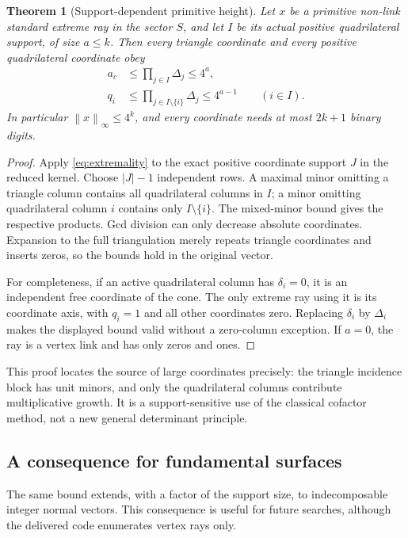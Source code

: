 \documentclass[11pt]{article}
\newtheorem{theorem}{Theorem}[section]
\theoremstyle{definition}
\theoremstyle{remark}
\newcommand{\norm}[1]{\left\lVert#1\right\rVert}
\begin{document}
\begin{theorem}[Support-dependent primitive height]
\label{thm:height}
Let $x$ be a primitive non-link standard extreme ray in the sector $S$, and
let $I$ be its actual positive quadrilateral support, of size $a\le k$.
Then every triangle coordinate and every positive quadrilateral coordinate
obey
\begin{align}
 a_c&\le\prod_{j\in I}\Delta_j\le4^a,\label{eq:triangleheight}\\
 q_i&\le\prod_{j\in I\setminus\{i\}}\Delta_j\le4^{a-1}
 \qquad(i\in I).\label{eq:quadheight}
\end{align}
In particular $\norm{x}_\infty\le4^k$, and every coordinate needs at most
$2k+1$ binary digits.
\end{theorem}
\begin{proof}
Apply \eqref{eq:extremality} to the exact positive coordinate support $J$ in
the reduced kernel. Choose $|J|-1$ independent rows. A maximal minor omitting
a triangle column contains all quadrilateral columns in $I$; a minor omitting
quadrilateral column $i$ contains only $I\setminus\{i\}$. The mixed-minor
bound gives the respective products. Gcd division can only decrease absolute
coordinates. Expansion to the full triangulation merely repeats triangle
coordinates and inserts zeros, so the bounds hold in the original vector.

For completeness, if an active quadrilateral column has $\delta_i=0$, it is
an independent free coordinate of the cone. The only extreme ray using it is
its coordinate axis, with $q_i=1$ and all other coordinates zero. Replacing
$\delta_i$ by $\Delta_i$ makes the displayed bound valid without a zero-column
exception. If $a=0$, the ray is a vertex link and has only zeros and ones.
\end{proof}

This proof locates the source of large coordinates precisely: the triangle
incidence block has unit minors, and only the quadrilateral columns contribute
multiplicative growth. It is a support-sensitive use of the classical
cofactor method, not a new general determinant principle.

\subsection{A consequence for fundamental surfaces}

The same bound extends, with a factor of the support size, to indecomposable
integer normal vectors. This consequence is useful for future searches,
although the delivered code enumerates vertex rays only.
\end{document}

